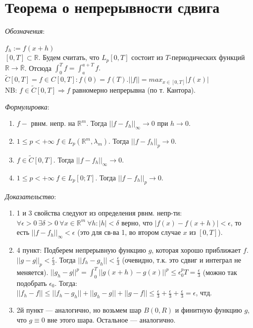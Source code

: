 \documentclass[paper=a4, fontsize=17pt]{article}
\begin{document}
\section{Теорема о непрерывности сдвига}
\emph{Обозначения}:

$f_h := f(x+h)$ \\
$[0, T] \subset \mathbb{R}$. Будем считать, что $L_p[0, T]$ состоит из $T$-периодических функций $\mathbb{R} \rightarrow \overline {\mathbb{R}}$. Отсюда $\int_{0}^{T} f = \int_{a}^{a+T} f.$ \\
$\widetilde{C}[0, T] = {f \in C[0, T]: f(0) = f(T) }. ||f|| = max_{x\in[0,T]}|f(x)|$ \\
NB: $f \in \widetilde{C}[0, T] \Rightarrow f$ равномерно непрерывна (по т. Кантора).

\emph{Формулировка}:
\begin{enumerate}
	\item $f - $ рвнм. непр. на $\mathbb{R}^m$. Тогда $||f-f_h||_\infty \rightarrow 0$ при $h\rightarrow 0$.
	\item $1 \leq p < + \infty \ f \in L_p(\mathbb{R}^m, \lambda_m)$. Тогда $||f-f_h||_p \rightarrow 0$.
	\item $f \in \widetilde{C}[0, T]$. Тогда $||f-f_h||_\infty \rightarrow 0$.
	\item $1 \leq p < + \infty \  f \in L_p[0; T]$. Тогда $||f-f_h||_p \rightarrow 0$.
\end{enumerate}

\emph{Доказательство}:

\begin{enumerate}
	\item 1 и 3 свойства следуют из определения рвнм. непр-ти:
		$\forall \epsilon > 0 \ \exists \delta > 0 \  \forall x \in \mathbb{R}^m \ \forall h: |h| < \delta$ верно, что $|f(x) - f(x+h)| < \epsilon$, то есть $||f-f_h||_\infty < \epsilon$
		(это для св-ва 1, во втором случае $x$ из $[0,T]$).
	\item 4 пункт: Подберем непрерывную функцию $g$, которая хорошо приближает $f$. $||g - g||_p < \frac{\epsilon}{3}$. Тогда $||f_h - g_h|| < \frac{\epsilon}{3}$ (очевидно, т.к. это сдвиг и интеграл не меняется). $||g_h-g||^p = \int_{0}^{T} ||g(x+h) - g(x)||^p \leq \epsilon_0^p T = \frac{\epsilon}{3}$ (можно так подобрать $\epsilon_0$. Тогда:  $||f_h - f|| \leq ||f_h-g_h|| + ||g_h - g|| + ||g - f|| \leq \frac{\epsilon}{3} + \frac{\epsilon}{3} + \frac{\epsilon}{3} = \epsilon$, чтд.
	\item 2й пункт --- аналогично, но возьмем шар $B(0, R)$ и финитную функцию $g$, что $g \equiv 0$ вне этого шара. Остальное --- аналогично. 
\end{enumerate}
\end{document}
